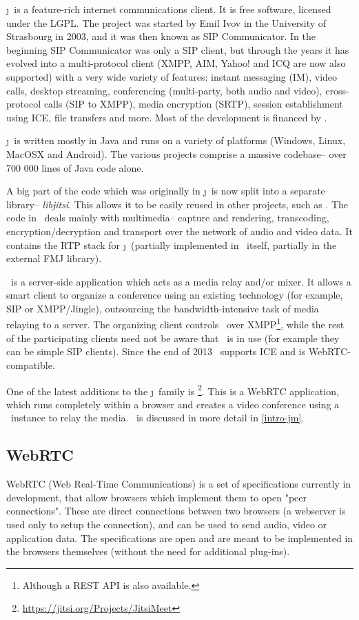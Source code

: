 \documentclass[twoside,openright,a4paper,12pt,english]{article}
\begin{document}
\j\ is a feature-rich internet communications client.
It is free software, licensed under the LGPL\cite{lgpl}.
The project was started by Emil Ivov in
the University of Strasbourg in 2003, and it was then known as SIP
Communicator. In the beginning
SIP Communicator was only a SIP client, but through the years it has evolved
into a multi-protocol
client (XMPP, AIM, Yahoo! and ICQ are now also supported) with a very wide variety
of features: instant messaging (IM), video calls, desktop streaming,
conferencing (multi-party, both audio and video), cross-protocol calls (SIP to
XMPP), media encryption (SRTP),
session establishment using ICE, file transfers and more.
Most of the development is financed by \bj.

\j\ is written mostly in Java and runs on a variety of
platforms (Windows, Linux, MacOSX and Android). The various projects comprise a massive codebase--
over 700 000 lines of Java code alone.

A big part of the code which was originally in \j\ is now split into a
separate library-- \emph{libjitsi}. This allows it to be easily reused in other
projects, such as \jvb. The code in \lj\ deals mainly with multimedia-- capture
and rendering, transcoding, encryption/decryption and transport over the
network of audio and video data. It contains the RTP stack for \j\ (partially
implemented in \lj\ itself, partially in the external FMJ library).

\jvb\ is a server-side application which acts as a media
relay and/or mixer. It allows a smart client to organize a conference
using an existing technology (for example, SIP or XMPP/Jingle), outsourcing the bandwidth-intensive task of media relaying to a server. 
The organizing client controls \jvb\ over XMPP\footnote{Although a REST API is also available.}, while the rest of the
participating clients need not be aware that \jvb\ is in use (for example they
can be simple SIP clients). Since the end of 2013 \jvb\ supports ICE and is WebRTC-compatible.

One of the latest additions to the \j\ family is
\jm\footnote{\url{https://jitsi.org/Projects/JitsiMeet}}. This is a WebRTC
application, which runs completely within a browser and creates a video
conference using a \jvb\ instance to relay the media. \jm\ is discussed in more detail in \ref{intro-jm}.




\subsection{WebRTC}
WebRTC (Web Real-Time Communications) is a set of specifications 
currently in development, that allow browsers which implement them to open
"peer connections". These are direct connections between two
browsers (a webserver is used only to setup the connection), and can be used to
send audio, video or application data. The specifications are open and are meant
to be implemented in the browsers themselves (without the need for additional
plug-ins).
\end{document}

